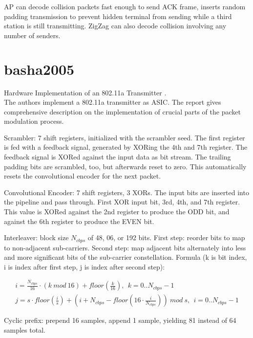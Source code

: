 AP can decode collision packets fast enough to send ACK frame, inserts random padding transmission to prevent hidden terminal from sending while a third station is still transmitting. ZigZag can also decode collision involving any number of senders.



\section*{basha2005}

Hardware Implementation of an 802.11a Transmitter \cite{basha2005}.\\

The authors implement a 802.11a transmitter as ASIC. The report gives comprehensive description on the implementation of crucial parts of the packet modulation process.

Scrambler: 7 shift registers, initialized with the scrambler seed. The first register is fed with a feedback signal, generated by XORing the 4th and 7th register. The feedback signal is XORed against the input data as bit stream. The trailing padding bits are scrambled, too, but afterwards reset to zero. This automatically resets the convolutional encoder for the next packet.

Convolutional Encoder: 7 shift registers, 3 XORs. The input bits are inserted into the pipeline and pass through. First XOR input bit, 3rd, 4th, and 7th register. This value is XORed against the 2nd register to produce the ODD bit, and against the 6th register to produce the EVEN bit.

Interleaver: block size $N_{cbps}$ of 48, 06, or 192 bits. First step: reorder bits to map to non-adjacent sub-carriers. Second step: map adjacent bits alternately into less and more significant bits of the sub-carrier constellation. Formula (k is bit index, i is index after first step, j is index after second step):

\begin{align}
  i = \frac{N_{cbps}}{16} \cdot (k ~mod ~16) + floor(\frac{k}{16}), ~~k = 0 .. N_{cbps} - 1 \\
  j = s \cdot floor(\frac{i}{s}) + (i + N_{cbps} - floor(16 \cdot \frac{i}{N_{cbps}})) ~mod ~s, ~~i = 0 .. N_{cbps} - 1  \label{eqn:interleaving}
\end{align}

Cyclic prefix: prepend 16 samples, append 1 sample, yielding 81 instead of 64 samples total.


